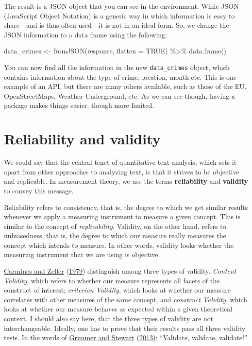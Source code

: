 \documentclass[
]{book}
\newenvironment{Shaded}{\begin{snugshade}}{\end{snugshade}}
\newcommand{\AttributeTok}[1]{\textcolor[rgb]{0.77,0.63,0.00}{#1}}
\newcommand{\ConstantTok}[1]{\textcolor[rgb]{0.00,0.00,0.00}{#1}}
\newcommand{\FunctionTok}[1]{\textcolor[rgb]{0.00,0.00,0.00}{#1}}
\newcommand{\NormalTok}[1]{#1}
\newcommand{\OtherTok}[1]{\textcolor[rgb]{0.56,0.35,0.01}{#1}}
\newcommand{\SpecialCharTok}[1]{\textcolor[rgb]{0.00,0.00,0.00}{#1}}
\begin{document}
The result is a JSON object that you can see in the environment. While JSON (JavaScript Object Notation) is a generic way in which information is easy to share - and is thus often used - it is not in an ideal form. So, we change the JSON information to a data frame using the following:

\begin{Shaded}
\begin{Highlighting}[]
\NormalTok{data\_crimes }\OtherTok{\textless{}{-}} \FunctionTok{fromJSON}\NormalTok{(response, }\AttributeTok{flatten =} \ConstantTok{TRUE}\NormalTok{) }\SpecialCharTok{\%\textgreater{}\%}
\FunctionTok{data.frame}\NormalTok{()}
\end{Highlighting}
\end{Shaded}

You can now find all the information in the new \texttt{data\_crimes} object, which contains information about the type of crime, location, month etc. This is one example of an API, but there are many others available, such as those of the EU, OpenStreetMaps, Weather Underground, etc. As we can see though, having a package makes things easier, though more limited.

\hypertarget{reliability-and-validity}{%
\chapter{Reliability and validity}\label{reliability-and-validity}}

We could say that the central tenet of quantitative text analysis, which sets it apart from other approaches to analyzing text, is that it strives to be objective and replicable. In measurement theory, we use the terms \textbf{reliability} and \textbf{validity} to convey this message.

Reliability refers to consistency, that is, the degree to which we get similar results whenever we apply a measuring instrument to measure a given concept. This is similar to the concept of \emph{replicability}. Validity, on the other hand, refers to unbiasedness, that is, the degree to which our measure really measures the concept which intends to measure. In other words, validity looks whether the measuring instrument that we are using is objective.

\protect\hyperlink{ref-Carmines1979a}{Carmines and Zeller} (\protect\hyperlink{ref-Carmines1979a}{1979}) distinguish among three types of validity. \emph{Content Validity}, which refers to whether our measure represents all facets of the construct of interest; \emph{criterion Validity}, which looks at whether our measure correlates with other measures of the same concept, and \emph{construct Validity}, which looks at whether our measure behaves as expected within a given theoretical context.
I should also say here, that the three types of validity are not interchangeable. Ideally, one has to prove that their results pass all three validity tests. In the words of \protect\hyperlink{ref-Grimmer2013a}{Grimmer and Stewart} (\protect\hyperlink{ref-Grimmer2013a}{2013}): ``Validate, validate, validate!''
\end{document}
